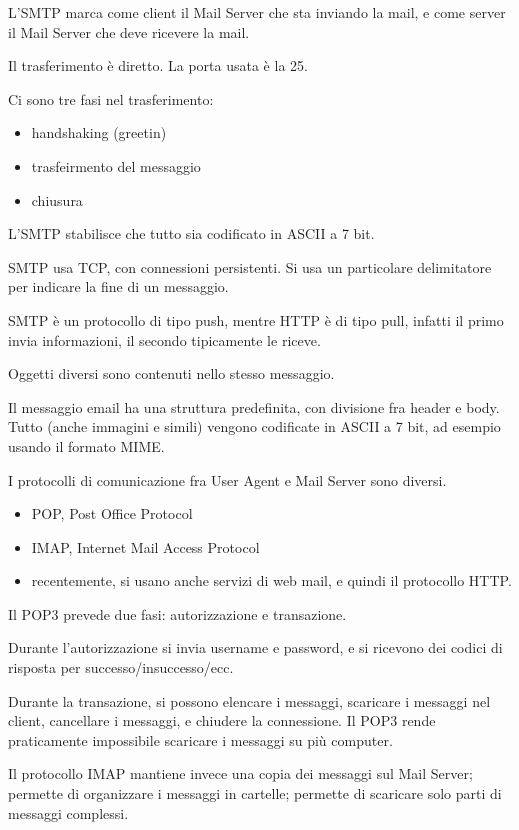 L'SMTP marca come client il Mail Server che sta inviando la mail, e come server il Mail Server che deve ricevere la mail.

Il trasferimento \`e diretto. La porta usata \`e la 25.

Ci sono tre fasi nel trasferimento:
\begin{itemize}
    \item handshaking (greetin)
    \item trasfeirmento del messaggio
    \item chiusura
\end{itemize}

L'SMTP stabilisce che tutto sia codificato in ASCII a 7 bit.

SMTP usa TCP, con connessioni persistenti. Si usa un particolare delimitatore per indicare la fine di un messaggio.

SMTP \`e un protocollo di tipo push, mentre HTTP \`e di tipo pull, infatti il primo invia informazioni, il secondo tipicamente le riceve.

Oggetti diversi sono contenuti nello stesso messaggio.

Il messaggio email ha una struttura predefinita, con divisione fra header e body. Tutto (anche immagini e simili) vengono codificate in ASCII a 7 bit, ad esempio usando il formato MIME.

I protocolli di comunicazione fra User Agent e Mail Server sono diversi.
\begin{itemize}
    \item POP, Post Office Protocol
    \item IMAP, Internet Mail Access Protocol
    \item recentemente, si usano anche servizi di web mail, e quindi il protocollo HTTP.
\end{itemize}

Il POP3 prevede due fasi: autorizzazione e transazione.

 Durante l'autorizzazione si invia username e password, e si ricevono dei codici di risposta per successo/insuccesso/ecc.

 Durante la transazione, si possono elencare i messaggi, scaricare i messaggi nel client, cancellare i messaggi, e chiudere la connessione. Il POP3 rende praticamente impossibile scaricare i messaggi su pi\`u computer.

 Il protocollo IMAP mantiene invece una copia dei messaggi sul Mail Server; permette di organizzare i messaggi in cartelle; permette di scaricare solo parti di messaggi complessi.

